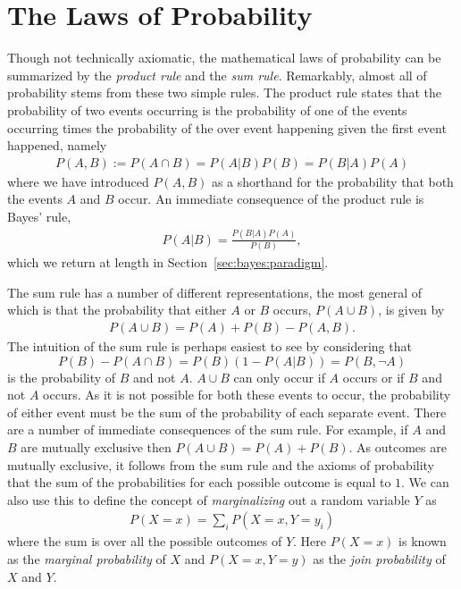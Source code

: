 \section{The Laws of Probability}
\label{sec:prob:laws}

Though not technically axiomatic, the mathematical laws of probability can be summarized by the \emph{product rule}
and the \emph{sum rule}.  Remarkably, almost all of probability stems from these two simple rules.
The product rule states that the probability of two events occurring is the probability of one of the events
occurring times the probability of the over event happening given the first event happened, namely
\begin{align}
\label{eq:prob:prod}
P(A,B) := P(A \cap B) = P(A|B) P(B) =  P(B|A) P(A)
\end{align}
where we have introduced $P(A,B)$ as a shorthand for the probability that both the events $A$ and $B$ occur.
An immediate consequence of the product rule is Bayes' rule,
\begin{align}
P(A|B) = \frac{P(B|A)P(A)}{P(B)},
\end{align}
which we return at length in Section~\ref{sec:bayes:paradigm}.

The sum rule has a number of different representations, the most general of which is that 
the probability that either $A$ or $B$ occurs, $P(A\cup B)$, is given by
\begin{align}
\label{eq:prob:sum}
P(A\cup B) = P(A) + P(B) - P(A, B).
\end{align}
The intuition of the sum rule is perhaps easiest to see by considering that
\[
P(B) - P(A \cap B) = P(B)(1-P(A|B)) = P(B, \neg A)
\]
 is the probability of $B$ and 
not $A$.  $A\cup B$ can only occur if $A$ occurs or if $B$ and not $A$ occurs.  As it is not
possible for both these events to occur, the probability of either event must be the sum of the
probability of each separate event.
There are a number of immediate consequences of the sum rule.  For example, if $A$ and $B$ are
mutually exclusive then $P(A\cup B) = P(A) + P(B)$.  As outcomes are mutually exclusive, it
follows from the sum rule and the axioms of probability that the sum of the probabilities
for each possible outcome is equal to $1$.  We can also use this to
define the concept of \emph{marginalizing} out a random variable $Y$ as
\begin{align}
\label{eq:prob:marginal}
P(X=x) = \sum_{i} P(X=x,Y=y_i)
\end{align}
where the sum is over all the possible outcomes of $Y$.  Here $P(X=x)$ is known as the
\emph{marginal probability} of $X$ and $P(X=x,Y=y)$ as the \emph{join probability} of $X$
and $Y$.

